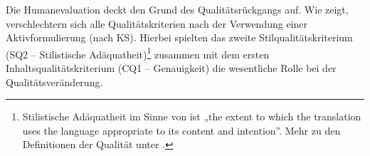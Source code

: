 \begin{figure}






























\captionsetup{width=.45\textwidth}
\begin{floatrow}
\end{floatrow}
\end{figure}

Die Humanevaluation deckt den Grund des Qualitätsrückgangs auf. Wie  zeigt, verschlechtern sich alle Qualitätskriterien nach der Verwendung einer Aktivformulierung (nach KS). Hierbei spielten das zweite Stilqualitätskriterium (SQ2 -- Stilistische Adäquatheit)\footnote{\textrm{Stilistische Adäquatheit im Sinne von \citet[163]{HutchinsSomers1992} ist „the extent to which the translation uses the language appropriate to its content and intention”. Mehr zu den Definitionen der Qualität unter .}} zusammen mit dem ersten Inhaltsqualitätskriterium (CQ1 -- Genauigkeit) die wesentliche Rolle bei der Qualitätsveränderung.


